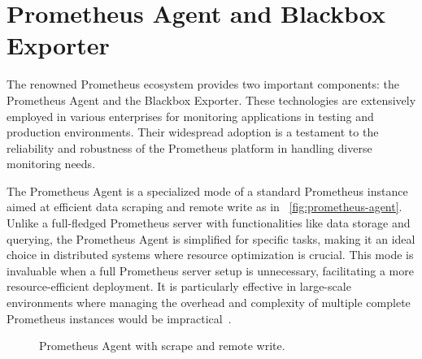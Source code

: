 \section{Prometheus Agent and Blackbox Exporter}

The renowned Prometheus ecosystem provides two important components: the Prometheus Agent and the Blackbox Exporter. These technologies are extensively employed in various enterprises for monitoring applications in testing and production environments. Their widespread adoption is a testament to the reliability and robustness of the Prometheus platform in handling diverse monitoring needs.

The Prometheus Agent is a specialized mode of a standard Prometheus instance aimed at efficient data scraping and remote write as in ~\autoref{fig:prometheus-agent}. Unlike a full-fledged Prometheus server with functionalities like data storage and querying, the Prometheus Agent is simplified for specific tasks, making it an ideal choice in distributed systems where resource optimization is crucial. This mode is invaluable when a full Prometheus server setup is unnecessary, facilitating a more resource-efficient deployment. It is particularly effective in large-scale environments where managing the overhead and complexity of multiple complete Prometheus instances would be impractical~\parencite{prometheusIntroducingPrometheusAgent}.

\begin{figure}[htpb]
    \centering
    \caption[Prometheus Agent]{Prometheus Agent with scrape and remote write.}\label{fig:prometheus-agent}
\end{figure}

